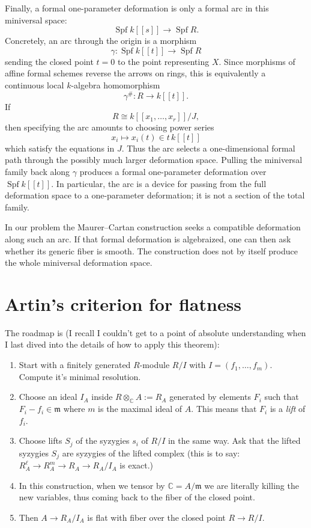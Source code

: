 Finally, a formal one-parameter deformation
is only a formal arc in this miniversal
space:
$$
\operatorname{Spf}k[[s]]
\longrightarrow
\operatorname{Spf}R.
$$
Concretely, an arc through the origin is a morphism
$$
\gamma:\operatorname{Spf}k[[t]]
\longrightarrow
\operatorname{Spf}R
$$
sending the closed point $t=0$ to the point representing
$X$. Since morphisms of affine formal schemes reverse the
arrows on rings, this is equivalently a continuous local
$k$-algebra homomorphism
$$
\gamma^\#:R\longrightarrow k[[t]].
$$
If
$$
R\cong k[[x_1,\ldots,x_r]]/J,
$$
then specifying the arc amounts to choosing power series
$$
x_i\longmapsto x_i(t)\in t\,k[[t]]
$$
which satisfy the equations in $J$. Thus the arc selects a
one-dimensional formal path through the possibly much
larger deformation space. Pulling the miniversal family
back along $\gamma$ produces a formal one-parameter
deformation over $\operatorname{Spf}k[[t]]$. In particular,
the arc is a device for passing from the full deformation
space to a one-parameter deformation; it is not a section
of the total family.

In our problem the Maurer--Cartan
construction seeks a compatible deformation
along such an arc. If that formal deformation
is algebraized, one can then ask whether its
generic fiber is smooth. The construction
does not by itself produce the whole
miniversal deformation space.

\section{Artin's criterion for flatness}
\label{section-artins-criterion}

\noindent
The roadmap is
(I recall I couldn't get to a point
of absolute understanding when I last
dived into the details of
how to apply this theorem):
\begin{enumerate}
\item Start with a finitely generated
$R$-module $R/I$ with $I = (f_1,…,f_m)$.
Compute it's minimal resolution.

\item Choose an ideal $I_A$ inside
$R \otimes_\mathbb{C} A := R_A$
generated by elements $F_i$
such that $F_i-f_i \in \mathfrak{m}$
where $m$ is the maximal ideal of $A$.
This means that $F_i$ is a {\it lift} of
$f_i$.

\item Choose lifts $S_j$ of the syzygies
$s_i$ of $R/I$ in the same way.
Ask that the lifted syzygies $S_j$
are syzygies of the lifted complex
(this is to say:
$R^\ell_A \to R^m_A\to R_A \to R_A/I_A$
is exact.)

\item In this construction, when we tensor
by  $\mathbb{C}=A/\mathfrak{m}$
we are literally killing the new variables,
thus coming back to the fiber of
the closed point.

\item Then $A \to R_A/I_A$ is flat
with fiber over the closed point
$R \to R/I$.
\end{enumerate}

